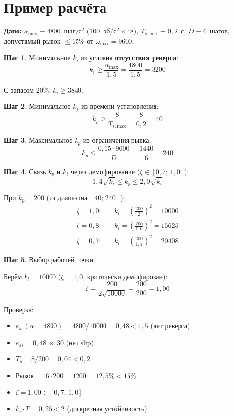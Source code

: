 \documentclass[12pt,a4paper]{article}
\begin{document}
\section{Пример расчёта}

\textbf{Дано:}
$\alpha_\text{max} = 4800$~шаг/с$^2$ (100~об/с$^2 \times 48$),
$T_{s,\text{max}} = 0{,}2$~с,
$D = 6$~шагов,
допустимый рывок $\le 15\%$ от $\omega_\text{max} = 9600$.

\textbf{Шаг 1.} Минимальное $k_i$ из условия \textbf{отсутствия реверса}:
\begin{equation*}
  k_i \ge \frac{\alpha_\text{max}}{1{,}5} = \frac{4800}{1{,}5} = 3200
\end{equation*}

С запасом 20\%: $k_i \ge 3840$.

\textbf{Шаг 2.} Минимальное $k_p$ из времени установления:
\begin{equation*}
  k_p \ge \frac{8}{T_{s,\text{max}}} = \frac{8}{0{,}2} = 40
\end{equation*}

\textbf{Шаг 3.} Максимальное $k_p$ из ограничения рывка:
\begin{equation*}
  k_p \le \frac{0{,}15 \cdot 9600}{D} = \frac{1440}{6} = 240
\end{equation*}

\textbf{Шаг 4.} Связь $k_p$ и $k_i$ через демпфирование ($\zeta \in [0{,}7;\,1{,}0]$):
\begin{equation*}
  1{,}4\sqrt{k_i} \le k_p \le 2{,}0\sqrt{k_i}
\end{equation*}

При $k_p = 200$ (из диапазона $[40;\,240]$):
\begin{align*}
  \zeta = 1{,}0: \quad & k_i = \left(\frac{200}{2}\right)^2 = 10000 \\
  \zeta = 0{,}8: \quad & k_i = \left(\frac{200}{1{,}6}\right)^2 = 15625 \\
  \zeta = 0{,}7: \quad & k_i = \left(\frac{200}{1{,}4}\right)^2 = 20408
\end{align*}

\textbf{Шаг 5.} Выбор рабочей точки.

Берём $k_i = 10000$ ($\zeta = 1{,}0$, критически демпфирован):
\begin{equation*}
  \zeta = \frac{200}{2\sqrt{10000}} = \frac{200}{200} = 1{,}00
\end{equation*}

Проверка:
\begin{itemize}
  \item $e_{ss}(\alpha=4800) = 4800/10000 = 0{,}48 < 1{,}5$ (нет реверса) \checkmark
  \item $e_{ss} = 0{,}48 \ll 30$ (нет slip) \checkmark
  \item $T_s = 8/200 = 0{,}04 < 0{,}2$ \checkmark
  \item Рывок $= 6 \cdot 200 = 1200 = 12{,}5\% < 15\%$ \checkmark
  \item $\zeta = 1{,}00 \in [0{,}7;\,1{,}0]$ \checkmark
  \item $k_i \cdot T = 0{,}25 < 2$ (дискретная устойчивость) \checkmark
\end{itemize}
\end{document}
